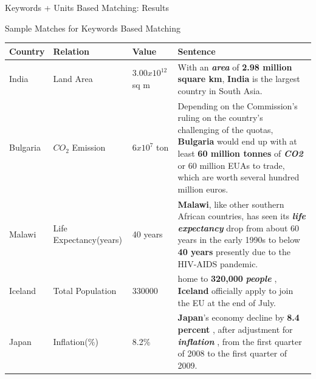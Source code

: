 \documentclass{beamer}
\begin{document}
\begin{frame}{Keywords + Units Based Matching: Results}
\begin{center}
\end{center}
\end{frame}
\begin{frame}{Sample Matches for Keywords Based Matching}


 \begin{table}
 \centering
 \tiny
 \begin{tabularx}{\textwidth}{|l|l|l|>{\raggedright}X|}
 \hline
 \textbf{Country} & \textbf{Relation} & \textbf{Value} & \textbf{Sentence}\tabularnewline
 \hline
 India & Land Area & $3.00 x 10^{12}$ sq m & With an \textit{\textbf{area}} of \textbf{2.98 million square km}, \textbf{India} is the largest country in South Asia.\tabularnewline
  \hline
  Bulgaria & $CO_{2}$ Emission & $ 6 x 10^{7}$ ton & Depending on the Commission's ruling on the country's challenging of the quotas, \textbf{Bulgaria} would end up with at least \textbf{60 million tonnes} of \textbf{\textit{CO2}} or 60 million EUAs to trade, which are worth several hundred million euros.\tabularnewline
  \hline
  Malawi & Life Expectancy(years) & 40 years & \textbf{Malawi}, like other southern African countries, has seen its \textit{\textbf{life expectancy}} drop from about 60 years in the early 1990s to below \textbf{40 years} presently due to the HIV-AIDS pandemic.\tabularnewline
  \hline
  Iceland & Total Population & 330000 & home to \textbf{320,000} \textit{\textbf{people}} , \textbf{Iceland} officially apply to join the EU at the end of July. \tabularnewline
  \hline
  Japan & Inflation(\%) & 8.2\% & \textbf{Japan}'s economy decline by \textbf{8.4 percent} , after adjustment for \textit{\textbf{inflation}} , from the first quarter of 2008 to the first quarter of 2009.\tabularnewline
  \hline
 \end{tabularx}
 \end{table}
 \end{frame}
\end{document}
